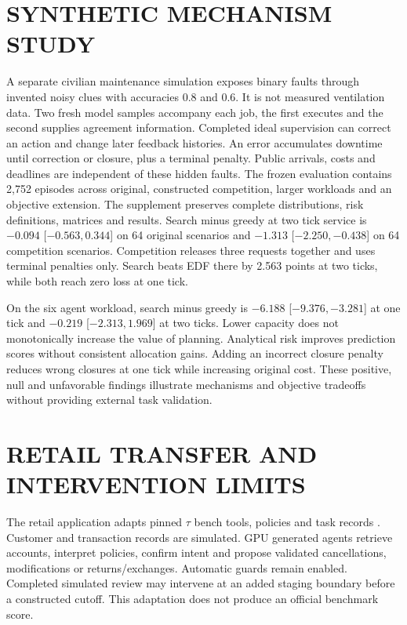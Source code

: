 


\section{SYNTHETIC MECHANISM STUDY}
\noindent A separate civilian maintenance simulation exposes binary faults through invented noisy clues with accuracies 0.8 and 0.6. It is not measured ventilation data. Two fresh model samples accompany each job, the first executes and the second supplies agreement information. Completed ideal supervision can correct an action and change later feedback histories. An error accumulates downtime until correction or closure, plus a terminal penalty. Public arrivals, costs and deadlines are independent of these hidden faults.
The frozen evaluation contains 2,752 episodes across original, constructed competition, larger workloads and an objective extension. The supplement preserves complete distributions, risk definitions, matrices and results. Search minus greedy at two tick service is $-0.094$ [$-0.563,0.344$] on 64 original scenarios and $-1.313$ [$-2.250,-0.438$] on 64 competition scenarios. Competition releases three requests together and uses terminal penalties only. Search beats EDF there by 2.563 points at two ticks, while both reach zero loss at one tick.

On the six agent workload, search minus greedy is $-6.188$ [$-9.376,-3.281$] at one tick and $-0.219$ [$-2.313,1.969$] at two ticks. Lower capacity does not monotonically increase the value of planning. Analytical risk improves prediction scores without consistent allocation gains. Adding an incorrect closure penalty reduces wrong closures at one tick while increasing original cost. These positive, null and unfavorable findings illustrate mechanisms and objective tradeoffs without providing external task validation.


\section{RETAIL TRANSFER AND INTERVENTION LIMITS}
\noindent The retail application adapts pinned $\tau$ bench tools, policies and task records \cite{yao2024tau}. Customer and transaction records are simulated. GPU generated agents retrieve accounts, interpret policies, confirm intent and propose validated cancellations, modifications or returns/exchanges. Automatic guards remain enabled. Completed simulated review may intervene at an added staging boundary before a constructed cutoff. This adaptation does not produce an official benchmark score.

